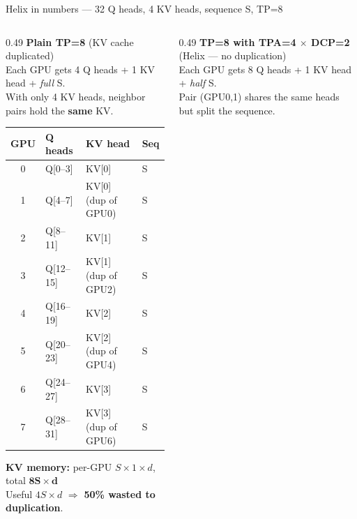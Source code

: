 \documentclass[aspectratio=169,10pt]{beamer}
\begin{document}
\begin{frame}{Helix in numbers --- 32 Q heads, 4 KV heads, sequence S, TP=8}
  \scriptsize
  \begin{columns}[T,onlytextwidth]
    \begin{column}{0.49\textwidth}
      \textbf{Plain TP=8} (KV cache duplicated)\\[0.2em]
      Each GPU gets 4 Q heads + 1 KV head + \emph{full} S.\\
      With only 4 KV heads, neighbor pairs hold the \textbf{same} KV.

      \vspace{0.3em}
      \begin{tabular}{@{}clll@{}}
        \toprule
        GPU & Q heads & KV head & Seq \\
        \midrule
        0 & Q[0--3]   & KV[0]                                & S \\
        1 & Q[4--7]   & \textcolor{slred}{KV[0] (dup of GPU0)} & S \\
        2 & Q[8--11]  & KV[1]                                & S \\
        3 & Q[12--15] & \textcolor{slred}{KV[1] (dup of GPU2)} & S \\
        4 & Q[16--19] & KV[2]                                & S \\
        5 & Q[20--23] & \textcolor{slred}{KV[2] (dup of GPU4)} & S \\
        6 & Q[24--27] & KV[3]                                & S \\
        7 & Q[28--31] & \textcolor{slred}{KV[3] (dup of GPU6)} & S \\
        \bottomrule
      \end{tabular}

      \vspace{0.4em}
      \textbf{KV memory:} per-GPU $S\!\times\!1\!\times\!d$, total $\mathbf{8S\!\times\!d}$ \\
      Useful $4S\!\times\!d$ $\Rightarrow$ \textcolor{slred}{\textbf{50\% wasted to duplication}}.
    \end{column}

    \begin{column}{0.49\textwidth}
      \textbf{TP=8 with TPA=4 $\times$ DCP=2} (Helix --- no duplication)\\[0.2em]
      Each GPU gets 8 Q heads + 1 KV head + \emph{half} S.\\
      Pair (GPU0,1) shares the same heads but split the sequence.


\end{column}
\end{columns}
\end{frame}
\end{document}
